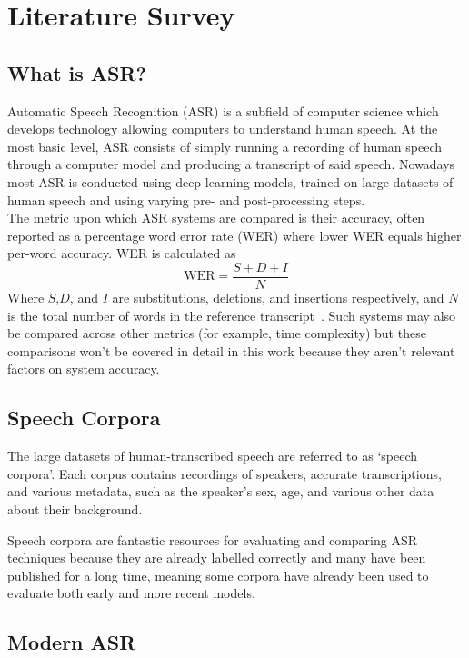 \chapter{Literature Survey}\label{ch:literature-survey}

\section{What is ASR?}\label{sec:what-is-asr?}

Automatic Speech Recognition (ASR) is a subfield of computer science which develops technology
allowing computers to understand human speech.
At the most basic level, ASR consists of simply running a recording of human speech through a
computer model and producing a transcript of said speech.
Nowadays most ASR is conducted using deep learning models, trained on large datasets of human
speech and using varying pre- and post-processing steps.\\

The metric upon which ASR systems are compared is their accuracy, often reported as a percentage
word error rate (WER) where lower WER equals higher per-word accuracy.
WER is calculated as
\[
    \text{WER} = \frac{S + D + I}{N}
\]
Where $S$,$D$, and $I$ are substitutions, deletions, and insertions respectively, and $N$ is the
total number of words in the reference transcript~\cite{gaikwad2010review}.
Such systems may also be compared across other metrics (for example, time complexity) but these
comparisons won't be covered in detail in this work because they aren't relevant factors on system
accuracy.

\section{Speech Corpora}\label{sec:speech-corpora}

The large datasets of human-transcribed speech are referred to as `speech corpora'.
Each corpus contains recordings of speakers, accurate transcriptions, and various metadata, such as
the speaker's sex, age, and various other data about their background.

Speech corpora are fantastic resources for evaluating and comparing ASR techniques because they
are already labelled correctly and many have been published for a long time, meaning some corpora
have already been used to evaluate both early and more recent models.

\section{Modern ASR}\label{sec:modern-asr}

